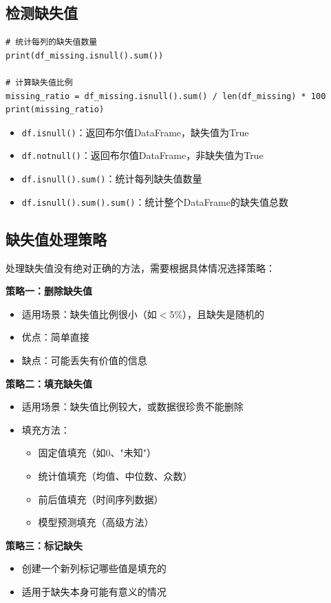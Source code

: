\documentclass[12pt,a4paper]{article}
\begin{document}
\subsection{检测缺失值}

\begin{lstlisting}[caption={检测缺失值}]
# 统计每列的缺失值数量
print(df_missing.isnull().sum())

# 计算缺失值比例
missing_ratio = df_missing.isnull().sum() / len(df_missing) * 100
print(missing_ratio)
\end{lstlisting}

\begin{knowledgebox}[缺失值检测方法]
\begin{itemize}
    \item \texttt{df.isnull()}：返回布尔值DataFrame，缺失值为True
    \item \texttt{df.notnull()}：返回布尔值DataFrame，非缺失值为True
    \item \texttt{df.isnull().sum()}：统计每列缺失值数量
    \item \texttt{df.isnull().sum().sum()}：统计整个DataFrame的缺失值总数
\end{itemize}
\end{knowledgebox}

\subsection{缺失值处理策略}

\begin{theorybox}[缺失值处理策略]
处理缺失值没有绝对正确的方法，需要根据具体情况选择策略：

\textbf{策略一：删除缺失值}
\begin{itemize}
    \item 适用场景：缺失值比例很小（如$<$5\%），且缺失是随机的
    \item 优点：简单直接
    \item 缺点：可能丢失有价值的信息
\end{itemize}

\textbf{策略二：填充缺失值}
\begin{itemize}
    \item 适用场景：缺失值比例较大，或数据很珍贵不能删除
    \item 填充方法：
    \begin{itemize}
        \item 固定值填充（如0、"未知"）
        \item 统计值填充（均值、中位数、众数）
        \item 前后值填充（时间序列数据）
        \item 模型预测填充（高级方法）
    \end{itemize}
\end{itemize}

\textbf{策略三：标记缺失}
\begin{itemize}
    \item 创建一个新列标记哪些值是填充的
    \item 适用于缺失本身可能有意义的情况
\end{itemize}
\end{theorybox}
\end{document}
